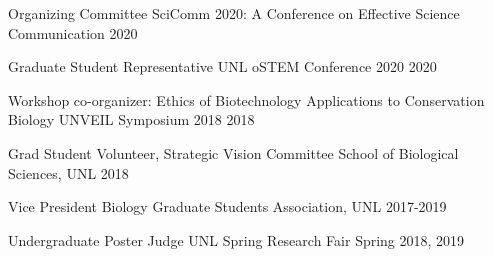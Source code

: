 \begin{cvservices}
 \cvservice
    {Organizing Committee}
    {SciComm 2020: A Conference on Effective Science Communication}
    {2020}

 \cvservice
    {Graduate Student Representative}
    {UNL oSTEM Conference 2020}
    {2020}
    
  \cvservice
    {Workshop co-organizer: Ethics of Biotechnology Applications to Conservation Biology}
    {UNVEIL Symposium 2018}
    {2018}

  \cvservice
    {Grad Student Volunteer, Strategic Vision Committee}
    {School of Biological Sciences, UNL}
    {2018}
    
  \cvservice
    {Vice President}
    {Biology Graduate Students Association, UNL}
    {2017-2019}
    
  \cvservice
    {Undergraduate Poster Judge}
    {UNL Spring Research Fair}
    {Spring 2018, 2019}
\end{cvservices}
